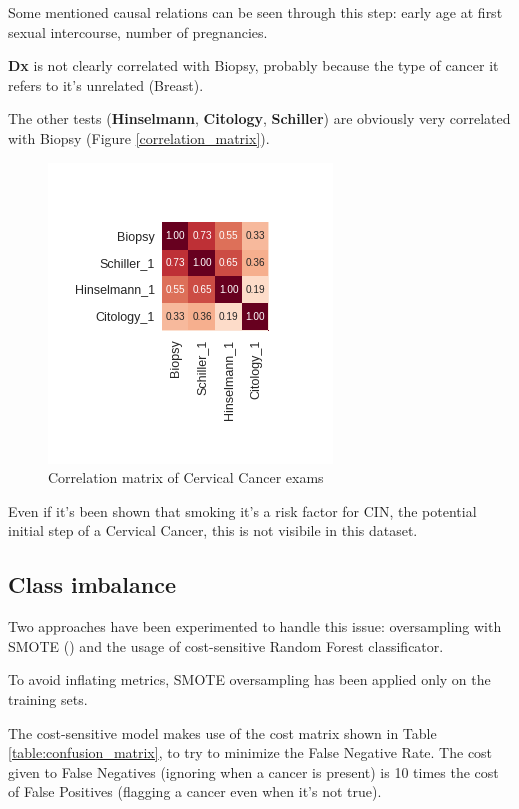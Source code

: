 Some mentioned causal relations can be seen through this step: early age at first sexual intercourse, number of pregnancies.

\textbf{Dx} is not clearly correlated with Biopsy, probably because the type of cancer it refers to it's unrelated (Breast).

The other tests (\textbf{Hinselmann}, \textbf{Citology}, \textbf{Schiller}) are obviously very correlated with Biopsy (Figure \ref{correlation_matrix}).

\begin{figure}
    \centerline{
        \includegraphics[width=0.25\paperwidth]{figures/exams_corr.png}}
    \caption{Correlation matrix of Cervical Cancer exams}
    \label{cond_box_plot}
\end{figure}

Even if it's been shown that smoking it's a risk factor for CIN, the potential initial step of a Cervical Cancer, this is not visibile in this dataset.

\subsection{Class imbalance}

Two approaches have been experimented to handle this issue: oversampling with SMOTE (\cite{Chawla2011}) and the usage of cost-sensitive Random Forest classificator.

To avoid inflating metrics, SMOTE oversampling has been applied only on the training sets.

The cost-sensitive model makes use of the cost matrix shown in Table \ref{table:confusion_matrix}, to try to minimize the False Negative Rate. The cost given to False Negatives (ignoring when a cancer is present) is 10 times the cost of False Positives (flagging a cancer even when it's not true).

